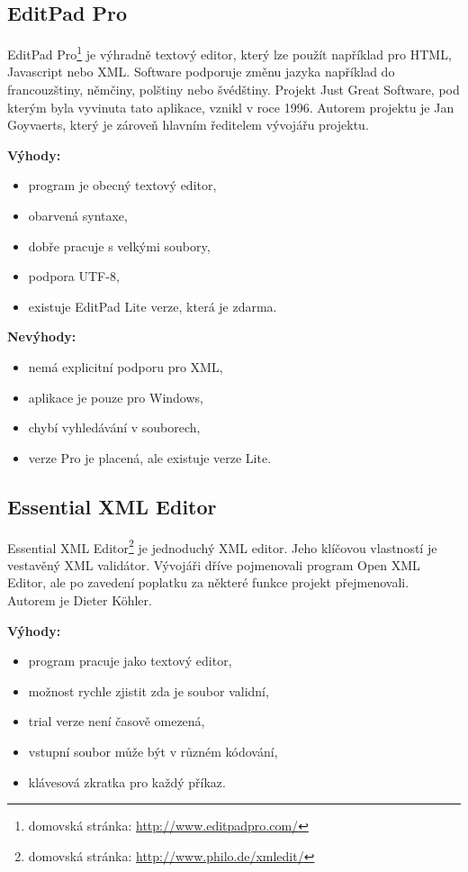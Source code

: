         \subsection{EditPad Pro}
            EditPad Pro\footnote{domovská stránka: \url{http://www.editpadpro.com/}} je výhradně textový editor, který lze použít například pro HTML, Javascript nebo XML. Software podporuje změnu jazyka například do francouzštiny, němčiny, polštiny nebo švédštiny. Projekt Just Great Software, pod kterým byla vyvinuta tato aplikace, vznikl v roce 1996. Autorem projektu je Jan Goyvaerts, který je zároveň hlavním ředitelem vývojářu projektu.

            \textbf{Výhody:}
                \begin{itemize}
                    \item program je obecný textový editor,
                    \item obarvená syntaxe,
                    \item dobře pracuje s velkými soubory,
                    \item podpora UTF-8,
                    \item existuje EditPad Lite verze, která je zdarma.
                \end{itemize}
                
            \textbf{Nevýhody:}
                \begin{itemize}
                    \item nemá explicitní podporu pro XML,
                    \item aplikace je pouze pro Windows,
                    \item chybí vyhledávání v souborech,
                    \item verze Pro je placená, ale existuje verze Lite.
                \end{itemize}
                
        \subsection{Essential XML Editor}
            Essential XML Editor\footnote{domovská stránka: \url{http://www.philo.de/xmledit/}} je jednoduchý XML editor. Jeho klíčovou vlastností je vestavěný XML validátor. Vývojáři dříve pojmenovali program Open XML Editor, ale po zavedení poplatku za některé funkce projekt přejmenovali. Autorem je Dieter Köhler. 
            
            \textbf{Výhody:}
                \begin{itemize}
                    \item program pracuje jako textový editor,
                    \item možnost rychle zjistit zda je soubor validní,
                    \item trial verze není časově omezená,
                    \item vstupní soubor může být v různém kódování,
                    \item klávesová zkratka pro každý příkaz.
                \end{itemize}
                
